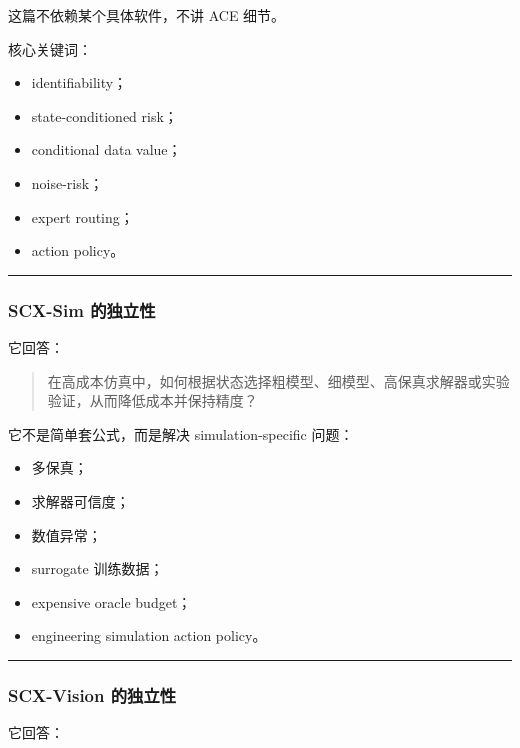 \documentclass[
  12pt,
]{ctexart}
\providecommand{\tightlist}{%
  \setlength{\itemsep}{0pt}\setlength{\parskip}{0pt}}
\begin{document}
这篇不依赖某个具体软件，不讲 ACE 细节。

核心关键词：

\begin{itemize}
\tightlist
\item
  identifiability；
\item
  state-conditioned risk；
\item
  conditional data value；
\item
  noise-risk；
\item
  expert routing；
\item
  action policy。
\end{itemize}

\begin{center}\rule{0.5\linewidth}{0.5pt}\end{center}

\subsubsection{SCX-Sim 的独立性}\label{scx-sim-ux7684ux72ecux7acbux6027}

它回答：

\begin{quote}
在高成本仿真中，如何根据状态选择粗模型、细模型、高保真求解器或实验验证，从而降低成本并保持精度？
\end{quote}

它不是简单套公式，而是解决 simulation-specific 问题：

\begin{itemize}
\tightlist
\item
  多保真；
\item
  求解器可信度；
\item
  数值异常；
\item
  surrogate 训练数据；
\item
  expensive oracle budget；
\item
  engineering simulation action policy。
\end{itemize}

\begin{center}\rule{0.5\linewidth}{0.5pt}\end{center}

\subsubsection{SCX-Vision
的独立性}\label{scx-vision-ux7684ux72ecux7acbux6027}

它回答：
\end{document}
